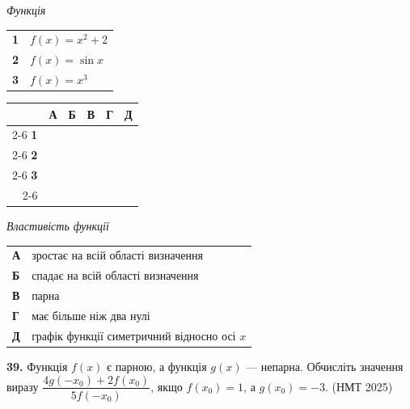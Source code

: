 \documentclass[14pt]{extarticle}
\newcommand{\nmtyear}[1]{\hfill{\small\color{yearcolor}(НМТ #1)}}
\begin{document}
\noindent
\begin{minipage}[t]{0.45\textwidth}
    \textit{Функція} \par \vspace{0.2cm}
    \begin{tabular}{@{}p{0.5cm} p{5cm}@{}}
    \textbf{1} & $f(x)=x^2+2$ \\[0.3cm]
    \textbf{2} & $f(x)=\sin x$ \\[0.3cm]
    \textbf{3} & $f(x)=x^3$ \\
    \end{tabular}
    
    \vspace{0.5cm}
    
    \begingroup
    \setlength{\tabcolsep}{4pt}
    \renewcommand{\arraystretch}{1.2}
    \small
    \begin{tabular}{r|c|c|c|c|c|}
         \multicolumn{1}{c}{} & \multicolumn{1}{c}{\textbf{А}} & \multicolumn{1}{c}{\textbf{Б}} & \multicolumn{1}{c}{\textbf{В}} & \multicolumn{1}{c}{\textbf{Г}} & \multicolumn{1}{c}{\textbf{Д}} \\ \cline{2-6}
         \textbf{1} & & & & & \\ \cline{2-6}
         \textbf{2} & & & & & \\ \cline{2-6}
         \textbf{3} & & & & & \\ \cline{2-6}
    \end{tabular}
    \endgroup
\end{minipage}%
\hfill
\begin{minipage}[t]{0.50\textwidth}
    \textit{Властивість функції} \par \vspace{0.2cm}
    \begin{tabular}{@{}p{0.5cm} p{7.5cm}@{}}
    \textbf{А} & зростає на всій області визначення \\[0.3cm]
    \textbf{Б} & спадає на всій області визначення \\[0.3cm]
    \textbf{В} & парна \\[0.3cm]
    \textbf{Г} & має більше ніж два нулі \\[0.3cm]
    \textbf{Д} & графік функції симетричний відносно осі $x$ \\
    \end{tabular}
\end{minipage}

\vspace{0.7cm}

\noindent\textbf{39.} Функція $f(x)$ є парною, а функція $g(x)$ — непарна. Обчисліть значення виразу $\dfrac{4g(-x_0) + 2f(x_0)}{5f(-x_0)}$, якщо $f(x_0)=1$, а $g(x_0)=-3$. \nmtyear{2025}
\end{document}
